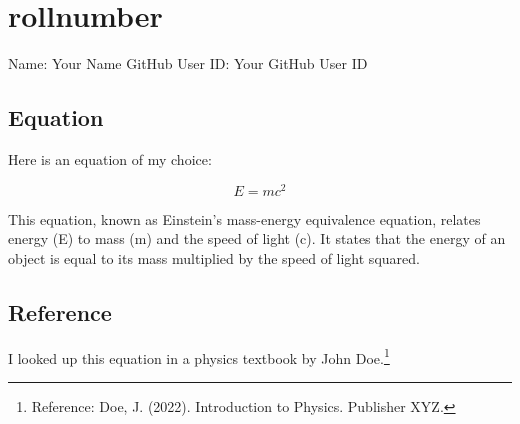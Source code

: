\section{rollnumber}

Name: Your Name
GitHub User ID: Your GitHub User ID

\subsection{Equation}

Here is an equation of my choice:

\begin{equation}
  E = mc^2
\end{equation}

This equation, known as Einstein's mass-energy equivalence equation, relates energy (E) to mass (m) and the speed of light (c). It states that the energy of an object is equal to its mass multiplied by the speed of light squared.

\subsection{Reference}

I looked up this equation in a physics textbook by John Doe.\footnote{Reference: Doe, J. (2022). Introduction to Physics. Publisher XYZ.}
